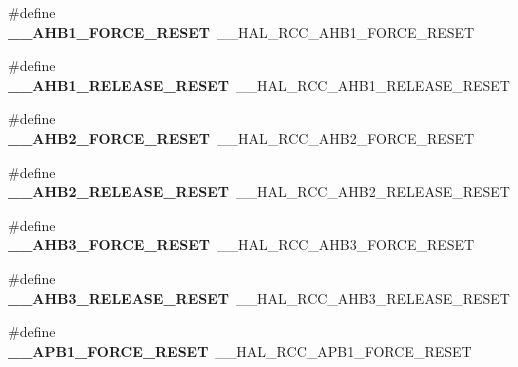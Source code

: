\begin{DoxyCompactItemize}
\item 
\hypertarget{group___h_a_l___r_c_c___aliased_ga254ce7a1ec636007ff532aca4f2d7b30}{\#define {\bfseries \-\_\-\-\_\-\-A\-H\-B1\-\_\-\-F\-O\-R\-C\-E\-\_\-\-R\-E\-S\-E\-T}~\-\_\-\-\_\-\-H\-A\-L\-\_\-\-R\-C\-C\-\_\-\-A\-H\-B1\-\_\-\-F\-O\-R\-C\-E\-\_\-\-R\-E\-S\-E\-T}\label{group___h_a_l___r_c_c___aliased_ga254ce7a1ec636007ff532aca4f2d7b30}

\item 
\hypertarget{group___h_a_l___r_c_c___aliased_ga86aa3cb593141469e24fb5d133413484}{\#define {\bfseries \-\_\-\-\_\-\-A\-H\-B1\-\_\-\-R\-E\-L\-E\-A\-S\-E\-\_\-\-R\-E\-S\-E\-T}~\-\_\-\-\_\-\-H\-A\-L\-\_\-\-R\-C\-C\-\_\-\-A\-H\-B1\-\_\-\-R\-E\-L\-E\-A\-S\-E\-\_\-\-R\-E\-S\-E\-T}\label{group___h_a_l___r_c_c___aliased_ga86aa3cb593141469e24fb5d133413484}

\item 
\hypertarget{group___h_a_l___r_c_c___aliased_gabf07e4804f7486e35e0f0054675fab77}{\#define {\bfseries \-\_\-\-\_\-\-A\-H\-B2\-\_\-\-F\-O\-R\-C\-E\-\_\-\-R\-E\-S\-E\-T}~\-\_\-\-\_\-\-H\-A\-L\-\_\-\-R\-C\-C\-\_\-\-A\-H\-B2\-\_\-\-F\-O\-R\-C\-E\-\_\-\-R\-E\-S\-E\-T}\label{group___h_a_l___r_c_c___aliased_gabf07e4804f7486e35e0f0054675fab77}

\item 
\hypertarget{group___h_a_l___r_c_c___aliased_ga9757b88e34916ad449503457d065b844}{\#define {\bfseries \-\_\-\-\_\-\-A\-H\-B2\-\_\-\-R\-E\-L\-E\-A\-S\-E\-\_\-\-R\-E\-S\-E\-T}~\-\_\-\-\_\-\-H\-A\-L\-\_\-\-R\-C\-C\-\_\-\-A\-H\-B2\-\_\-\-R\-E\-L\-E\-A\-S\-E\-\_\-\-R\-E\-S\-E\-T}\label{group___h_a_l___r_c_c___aliased_ga9757b88e34916ad449503457d065b844}

\item 
\hypertarget{group___h_a_l___r_c_c___aliased_ga967e453f7a2dc917a2f43041bc3530bc}{\#define {\bfseries \-\_\-\-\_\-\-A\-H\-B3\-\_\-\-F\-O\-R\-C\-E\-\_\-\-R\-E\-S\-E\-T}~\-\_\-\-\_\-\-H\-A\-L\-\_\-\-R\-C\-C\-\_\-\-A\-H\-B3\-\_\-\-F\-O\-R\-C\-E\-\_\-\-R\-E\-S\-E\-T}\label{group___h_a_l___r_c_c___aliased_ga967e453f7a2dc917a2f43041bc3530bc}

\item 
\hypertarget{group___h_a_l___r_c_c___aliased_gacf2ccc00726b7722836cddb8f42db97c}{\#define {\bfseries \-\_\-\-\_\-\-A\-H\-B3\-\_\-\-R\-E\-L\-E\-A\-S\-E\-\_\-\-R\-E\-S\-E\-T}~\-\_\-\-\_\-\-H\-A\-L\-\_\-\-R\-C\-C\-\_\-\-A\-H\-B3\-\_\-\-R\-E\-L\-E\-A\-S\-E\-\_\-\-R\-E\-S\-E\-T}\label{group___h_a_l___r_c_c___aliased_gacf2ccc00726b7722836cddb8f42db97c}

\item 
\hypertarget{group___h_a_l___r_c_c___aliased_gad52dd8358580ee80c5d66fb0ae3208fa}{\#define {\bfseries \-\_\-\-\_\-\-A\-P\-B1\-\_\-\-F\-O\-R\-C\-E\-\_\-\-R\-E\-S\-E\-T}~\-\_\-\-\_\-\-H\-A\-L\-\_\-\-R\-C\-C\-\_\-\-A\-P\-B1\-\_\-\-F\-O\-R\-C\-E\-\_\-\-R\-E\-S\-E\-T}\label{group___h_a_l___r_c_c___aliased_gad52dd8358580ee80c5d66fb0ae3208fa}


\end{DoxyCompactItemize}
